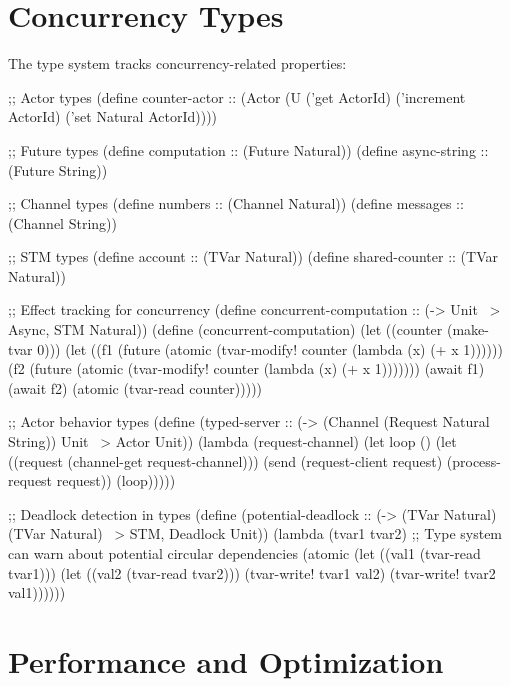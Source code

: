 \section{Concurrency Types}
\label{sec:concurrency-types}


The type system tracks concurrency-related properties:

\begin{example}
\begin{lambdustcode}
;; Actor types
(define counter-actor :: (Actor (U ('get ActorId) ('increment ActorId) ('set Natural ActorId))))

;; Future types  
(define computation :: (Future Natural))
(define async-string :: (Future String))

;; Channel types
(define numbers :: (Channel Natural))
(define messages :: (Channel String)) 

;; STM types
(define account :: (TVar Natural))
(define shared-counter :: (TVar Natural))

;; Effect tracking for concurrency
(define concurrent-computation :: (-> Unit ~> {Async, STM} Natural))
(define (concurrent-computation)
  (let ((counter (make-tvar 0)))
    (let ((f1 (future (atomic (tvar-modify! counter (lambda (x) (+ x 1))))))
          (f2 (future (atomic (tvar-modify! counter (lambda (x) (+ x 1)))))))
      (await f1)
      (await f2)
      (atomic (tvar-read counter)))))

;; Actor behavior types
(define (typed-server :: (-> (Channel (Request Natural String)) Unit ~> {Actor} Unit))
  (lambda (request-channel)
    (let loop ()
      (let ((request (channel-get request-channel)))
        (send (request-client request) (process-request request))
        (loop)))))

;; Deadlock detection in types
(define (potential-deadlock :: (-> (TVar Natural) (TVar Natural) ~> {STM, Deadlock} Unit))
  (lambda (tvar1 tvar2)
    ;; Type system can warn about potential circular dependencies
    (atomic 
      (let ((val1 (tvar-read tvar1)))
        (let ((val2 (tvar-read tvar2)))
          (tvar-write! tvar1 val2)
          (tvar-write! tvar2 val1))))))
\end{lambdustcode}
\end{example}

\section{Performance and Optimization}
\label{sec:concurrency-performance}

